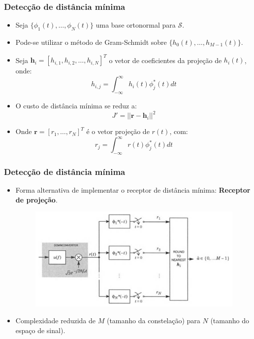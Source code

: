 \begin{frame}
	\frametitle{Detecção de distância mínima}

	\begin{itemize}
	    \item Seja $\{\phi_1(t),\ldots,\phi_N(t) \}$ uma base ortonormal para $\mathcal{S}$.
	    \item Pode-se utilizar o método de Gram-Schmidt sobre $\{h_0(t),\ldots,h_{M-1}(t) \}$.
	    \item Seja $\mathbf{h}_i = [h_{i,1}, h_{i,2},\ldots,h_{i,N}]^T$ o vetor de coeficientes da projeção de $h_i(t)$, onde:
	    \begin{equation*}
		h_{i,j} = \int_{-\infty}^{\infty} h_i(t)\phi_j^*(t) dt
	    \end{equation*}
	    \item O custo de distância mínima se reduz a:
	    \begin{equation*}
		J' = || \mathbf{r} - \mathbf{h}_i ||^2
	    \end{equation*}
	    \item Onde $\mathbf{r} = [r_1,\ldots,r_N]^T$ é o vetor projeção de $r(t)$, com:
	    \begin{equation*}
		r_j = \int_{-\infty}^{\infty} r(t)\phi_j^*(t) dt
	    \end{equation*}
	\end{itemize}
\end{frame}

\begin{frame}
	\frametitle{Detecção de distância mínima}

	\begin{itemize}
	    \item Forma alternativa de implementar o receptor de distância mínima: \textbf{Receptor de projeção}.    
	    \begin{figure}[t]	
	      \begin{center}
		\includegraphics[width=0.75\columnwidth]{figs/adv_04}
	      \end{center}
	    \end{figure}
	    \item Complexidade reduzida de $M$ (tamanho da constelação) para $N$ (tamanho do espaço de sinal).
	\end{itemize}
\end{frame}

